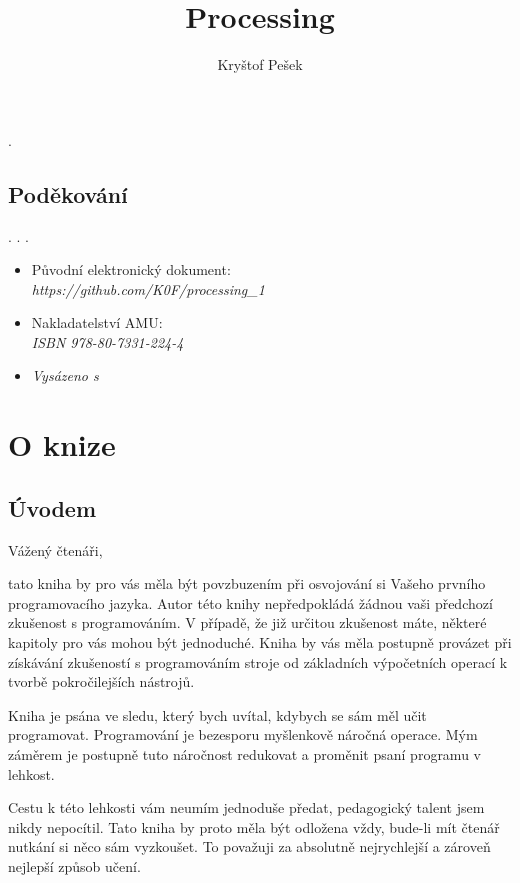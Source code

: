 \documentclass[10pt]{book}
\title{Processing}
\author{Kryštof Pešek}
\date{} %
\newcommand{\oddil}[1]{\section{#1}\index{#1}\label{#1}}
\begin{document}
.
\thispagestyle{empty}
\newpage
\oddil{Poděkování}
\thispagestyle{empty}
.
\newpage
.
\thispagestyle{empty}
\newpage
.
\thispagestyle{empty}


\vfill

\begin{itemize}
\item
Původní elektronický dokument: \\
{\em https://github.com/K0F/processing\_1}
\item
Nakladatelství AMU: \\
{\em ISBN 978-80-7331-224-4}
\item
{\em Vysázeno s \XeLaTeX}

\end{itemize}



\thispagestyle{empty}



\tableofcontents


\chapter{O knize}



\vfill
\thispagestyle{empty}



\oddil{Úvodem}




Vážený čtenáři,

tato kniha by pro vás měla být povzbuzením při osvojování si Vašeho prvního programovacího jazyka. Autor této knihy nepředpokládá žádnou vaši předchozí zkušenost s programováním. V případě, že již určitou zkušenost máte, některé kapitoly pro vás mohou být jednoduché. Kniha by vás měla postupně provázet při získávání zkušeností s programováním stroje od základních výpočetních operací k tvorbě pokročilejších nástrojů.

Kniha je psána ve sledu, který bych uvítal, kdybych se sám měl učit programovat. Programování je bezesporu myšlenkově náročná operace. Mým záměrem je postupně tuto náročnost redukovat a proměnit psaní programu v lehkost.

Cestu k této lehkosti vám neumím jednoduše předat, pedagogický talent jsem nikdy nepocítil. Tato kniha by proto měla být odložena vždy, bude-li mít čtenář nutkání si něco sám vyzkoušet. To považuji za absolutně nejrychlejší a zároveň nejlepší způsob učení.
\end{document}
